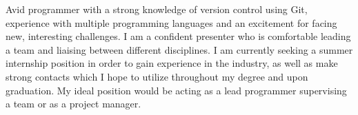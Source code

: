 

\begin{cvparagraph}
    Avid programmer with a strong knowledge of version control using Git, experience with multiple programming languages and an excitement for facing new, interesting challenges. I am a confident presenter who is comfortable leading a team and liaising between different disciplines. I am currently seeking a summer internship position in order to gain experience in the industry, as well as make strong contacts which I hope to utilize throughout my degree and upon graduation. My ideal position would be acting as a lead programmer supervising a team or as a project manager.

\end{cvparagraph}
